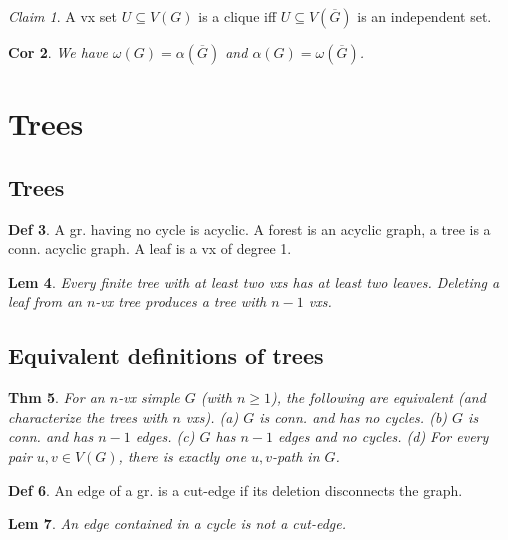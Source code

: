 \documentclass[11pt, fleqn, a4paper, landscape]{article}
\theoremstyle{plain} %
\newtheorem{thm}{Thm}
\newtheorem{lem}[thm]{Lem}
\newtheorem{cor}[thm]{Cor}
\theoremstyle{remark} %
\newtheorem{claim}[thm]{Claim}
\theoremstyle{definition} %
\newtheorem{defi}[thm]{Def}
\begin{document}
\begin{multicols}{5}
\begin{claim}
A vx set $U\subseteq V (G)$ is a clique iff $U\subseteq V(\overline{G})$ is an independent set.
\end{claim}

\begin{cor}
We have $\omega(G)=\alpha(\overline{G})$ and $\alpha(G)=\omega(\overline{G})$.
\end{cor}

\section{Trees}
\subsection{Trees}
\begin{defi}
A gr. having no cycle is acyclic. A forest is an acyclic graph, a tree is a conn. acyclic graph. A leaf is a vx of degree 1.
\end{defi}
\addtocounter{thm}{1}
\begin{lem}
Every finite tree with at least two vxs has at least two leaves. Deleting a leaf from an $n$-vx tree produces a tree with $n-1$ vxs.
\end{lem}

\subsection{Equivalent definitions of trees}

\begin{thm}
For an $n$-vx simple $G$ (with $n \ge 1$), the following are equivalent (and
characterize the trees with $n$ vxs).
(a) $G$ is conn. and has no cycles.
(b) $G$ is conn. and has $n - 1$ edges.
(c) $G$ has $n - 1$ edges and no cycles.
(d) For every pair $u, v \in V (G)$, there is exactly one $u, v$-path in $G$.
\end{thm}

\begin{defi}
An edge of a gr. is a cut-edge if its deletion disconnects the graph.
\end{defi}

\begin{lem}
An edge contained in a cycle is not a cut-edge.
\end{lem}


\addtocounter{thm}{1}


\end{multicols}
\end{document}
